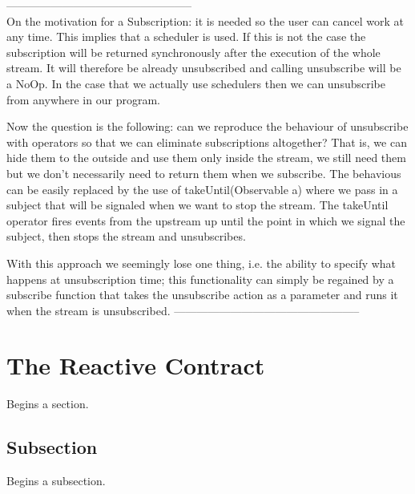 --------------------------------------------------\\
On the motivation for a Subscription: it is needed so the user can cancel work at any time. This implies that a scheduler is used. If this is not the case the subscription will be returned synchronously after the execution of the whole stream. It will therefore be already unsubscribed and calling unsubscribe will be a NoOp. In the case that we actually use schedulers then we can unsubscribe from anywhere in our program. 

Now the question is the following: can we reproduce the behaviour of unsubscribe with operators so that we can eliminate subscriptions altogether? That is, we can hide them to the outside and use them only inside the stream, we still need them but we don't necessarily need to return them when we subscribe. The behavious can be easily replaced by the use of takeUntil(Observable a) where we pass in a subject that will be signaled when we want to stop the stream. The takeUntil operator fires events from the upstream up until the point in which we signal the subject, then stops the stream and unsubscribes. 

With this approach we seemingly lose one thing, i.e. the ability to specify what happens at unsubscription time; this functionality can simply be regained by a subscribe function that takes the unsubscribe action as a parameter and runs it when the stream is unsubscribed.
--------------------------------------------------

\section{The Reactive Contract}
\label{sec:sec01}

Begins a section.

\subsection{Subsection}
\label{subsec:subsec01}

Begins a subsection.

\listoftodos

